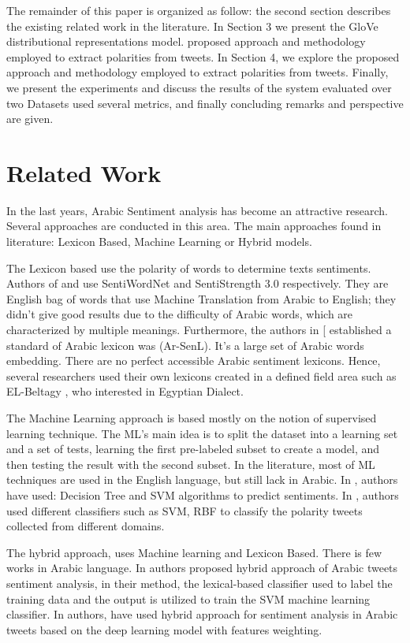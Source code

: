 \documentclass[conference]{IEEEtran}
\begin{document}
The remainder of this paper is organized as follow: the second section describes the existing related work in the literature. In Section 3 we present the GloVe distributional representations model. proposed approach and methodology employed to extract polarities from tweets. In Section 4, we explore the proposed approach and methodology employed to extract polarities from tweets. Finally, we present the experiments and discuss the results of the system evaluated over two Datasets used several metrics, and finally concluding remarks and perspective are given.


\section{Related Work}


In the last years, Arabic Sentiment analysis has become an attractive research. Several approaches are conducted in   this area. The main approaches found in literature:  Lexicon Based, Machine Learning or Hybrid models. 

The Lexicon based use the polarity of words to determine texts sentiments. Authors of \cite{8549704} and \cite{7975223} use SentiWordNet and SentiStrength 3.0 respectively. They are English bag of words that use Machine Translation from Arabic to English; they didn’t give good results due to the difficulty of Arabic words, which are characterized by multiple meanings. Furthermore, the authors in [\cite{8125054} established a standard of Arabic lexicon was (Ar-SenL). It’s a large set of Arabic words embedding. There are no perfect accessible Arabic sentiment lexicons. Hence, several researchers used their own lexicons created in a defined field area such as EL-Beltagy \cite{6544421}, who interested in Egyptian Dialect.

The Machine Learning approach is based mostly on the notion of supervised learning technique. The ML's main idea is to split the dataset into a learning set and a set of tests, learning the first pre-labeled subset to create a model, and then testing the result with the second subset. In the literature, most of ML techniques are used in the English language, but still lack in Arabic. In \cite{8530517}, authors have used: Decision Tree and SVM algorithms to predict sentiments. In \cite{7514636}, authors used different classifiers such as SVM, RBF to classify the polarity tweets collected from different domains. 

The hybrid approach, uses Machine learning and Lexicon Based. There is few works in Arabic language. In \cite{8250273} authors proposed hybrid approach of Arabic tweets sentiment analysis, in their method, the lexical-based classifier used to label the training data and the output is utilized to train the SVM machine learning classifier.
 In \cite{8706408} authors, have used hybrid approach for sentiment analysis in Arabic tweets based on the deep learning model with features weighting.
\end{document}
